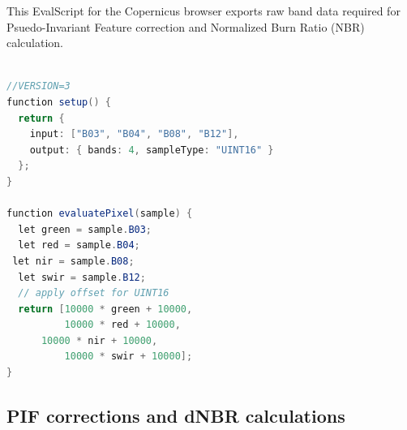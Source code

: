 \documentclass[
]{article}
\newenvironment{Shaded}{\begin{snugshade}}{\end{snugshade}}
\newcommand{\AttributeTok}[1]{\textcolor[rgb]{0.13,0.29,0.53}{#1}}
\newcommand{\ConstantTok}[1]{\textcolor[rgb]{0.56,0.35,0.01}{#1}}
\newcommand{\ControlFlowTok}[1]{\textcolor[rgb]{0.13,0.29,0.53}{\textbf{#1}}}
\newcommand{\DecValTok}[1]{\textcolor[rgb]{0.00,0.00,0.81}{#1}}
\newcommand{\FunctionTok}[1]{\textcolor[rgb]{0.13,0.29,0.53}{\textbf{#1}}}
\newcommand{\NormalTok}[1]{#1}
\newcommand{\OtherTok}[1]{\textcolor[rgb]{0.56,0.35,0.01}{#1}}
\newcommand{\SpecialCharTok}[1]{\textcolor[rgb]{0.81,0.36,0.00}{\textbf{#1}}}
\newcommand{\StringTok}[1]{\textcolor[rgb]{0.31,0.60,0.02}{#1}}
\begin{document}
\begin{Shaded}
\end{Shaded}

This EvalScript for the Copernicus browser exports raw band data
required for Psuedo-Invariant Feature correction and Normalized Burn
Ratio (NBR) calculation.

\begin{lstlisting}[language=Java]

//VERSION=3
function setup() {
  return {
    input: ["B03", "B04", "B08", "B12"],
    output: { bands: 4, sampleType: "UINT16" }
  };
}

function evaluatePixel(sample) {
  let green = sample.B03;
  let red = sample.B04;
 let nir = sample.B08;
  let swir = sample.B12;
  // apply offset for UINT16 
  return [10000 * green + 10000, 
          10000 * red + 10000, 
      10000 * nir + 10000, 
          10000 * swir + 10000]; 
}
\end{lstlisting}

\subsection{PIF corrections and dNBR
calculations}\label{pif-corrections-and-dnbr-calculations}
\end{document}
